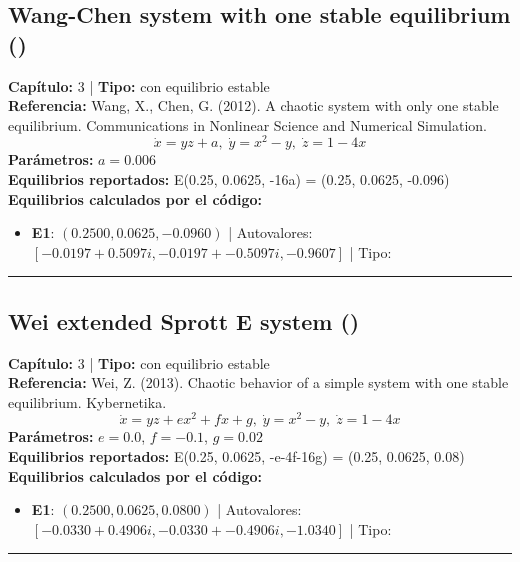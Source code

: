 \subsection*{Wang-Chen system with one stable equilibrium ()}
\textbf{Capítulo:} 3 | \textbf{Tipo:} con equilibrio estable\\
\textbf{Referencia:} Wang, X., Chen, G. (2012). A chaotic system with only one stable equilibrium. Communications in Nonlinear Science and Numerical Simulation.\\
\[\dot{x}=yz+a, \; \dot{y}=x^2-y, \; \dot{z}=1-4x\]
\textbf{Parámetros:} $a = 0.006$\\
\textbf{Equilibrios reportados:} E(0.25, 0.0625, -16a) = (0.25, 0.0625, -0.096)\\
\textbf{Equilibrios calculados por el código:}
\begin{itemize}
  \item \textbf{E1}: $(0.2500, 0.0625, -0.0960)$ | Autovalores: $[-0.0197 + 0.5097i, -0.0197 + -0.5097i, -0.9607]$ | Tipo: 
\end{itemize}
\hrule

\subsection*{Wei extended Sprott E system ()}
\textbf{Capítulo:} 3 | \textbf{Tipo:} con equilibrio estable\\
\textbf{Referencia:} Wei, Z. (2013). Chaotic behavior of a simple system with one stable equilibrium. Kybernetika.\\
\[\dot{x}=yz+ex^2+fx+g, \; \dot{y}=x^2-y, \; \dot{z}=1-4x\]
\textbf{Parámetros:} $e = 0.0$, $f = -0.1$, $g = 0.02$\\
\textbf{Equilibrios reportados:} E(0.25, 0.0625, -e-4f-16g) = (0.25, 0.0625, 0.08)\\
\textbf{Equilibrios calculados por el código:}
\begin{itemize}
  \item \textbf{E1}: $(0.2500, 0.0625, 0.0800)$ | Autovalores: $[-0.0330 + 0.4906i, -0.0330 + -0.4906i, -1.0340]$ | Tipo: 
\end{itemize}
\hrule

